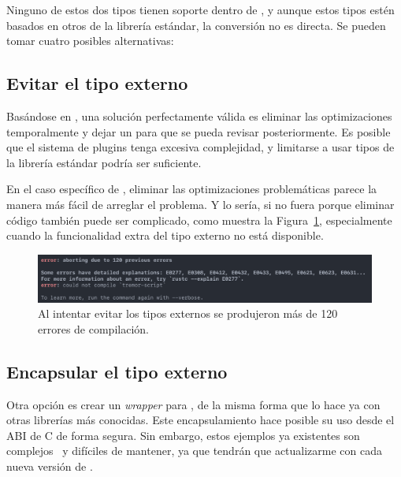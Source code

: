 Ninguno de estos dos tipos tienen soporte dentro de \abistable, y aunque estos
tipos estén basados en otros de la librería estándar, la conversión no es
directa. Se pueden tomar cuatro posibles alternativas:

\subsection{Evitar el tipo externo}

Basándose en \work, una solución perfectamente válida es eliminar las
optimizaciones temporalmente y dejar un  para que se pueda revisar
posteriormente. Es posible que el sistema de plugins tenga excesiva complejidad,
y limitarse a usar tipos de la librería estándar podría ser suficiente.

En el caso específico de , eliminar las optimizaciones problemáticas
parece la manera más fácil de arreglar el problema. Y lo sería, si no fuera
porque eliminar código también puede ser complicado, como muestra la
Figura~\ref{fig:errors}, especialmente cuando la funcionalidad extra del tipo
externo no está disponible.

\begin{figure}
    \centering
    \includegraphics[width=\textwidth]{./Imagenes/errors.png}
    \caption{Al intentar evitar los tipos externos se produjeron más de 120
    errores de compilación.}%
    \label{fig:errors}
\end{figure}

\subsection{Encapsular el tipo externo}

Otra opción es crear un \emph{wrapper} para , de la misma forma
que lo hace ya \abistable con otras librerías más conocidas. Este
encapsulamiento hace posible su uso desde el ABI de C de forma segura. Sin
embargo, estos ejemplos ya existentes son complejos~\cite{complexwrapper} y
difíciles de mantener, ya que tendrán que actualizarme con cada nueva versión de
.


